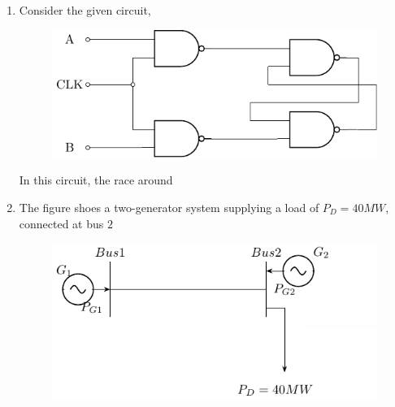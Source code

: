 \documentclass[journal]{IEEEtran}
\begin{document}
\begin{enumerate}
\begin{enumerate}
\end{enumerate}
\item Consider the given circuit,\\
\begin{figure}[H]
			\centering
			\includegraphics[scale=0.75]{figs/q20.png}
			\label{stemplot}
		\end{figure}
	In this circuit, the race around 
	\begin{enumerate}
\end{enumerate}
\item The figure shoes a two-generator system supplying a load of $P_D=40MW$, connected at bus $2$\\
\begin{figure}[H]
			\centering
			\includegraphics[scale=0.75]{figs/q21.png}

\end{figure}
\end{enumerate}
\end{document}
